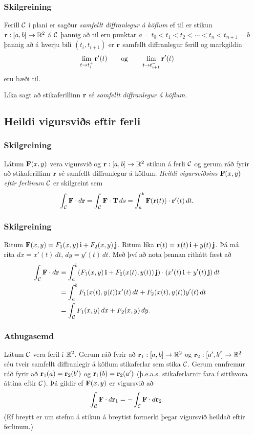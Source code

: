 \subsubsection{Skilgreining }
Ferill $\cal C$ í plani er sagður {\em samfellt diffranlegur á köflum} ef til er stikun $\mbox{${\bf r}$}:[a,b]\rightarrow {\mathbb R}^2$ á $\cal C$ þannig að  til eru punktar $a=t_0<t_1<t_2<\cdots<t_n<t_{n+1}=b$ þannig að á hverju bili $(t_i,t_{i+1})$ er $\mbox{${\bf r}$}$ samfellt diffranlegur ferill og markgildin
$$\lim_{t\rightarrow t_i^+}\mbox{${\bf r}$}'(t)\qquad\mbox{og}\qquad 
\lim_{t\rightarrow t_{i+1}^-}\mbox{${\bf r}$}'(t)$$
eru bæði til.  

Líka sagt að stikaferillinn $\mbox{${\bf r}$}$ sé {\em samfellt diffranlegur á köflum.}



\subsection{Heildi vigursviðs eftir ferli} 

\subsubsection{Skilgreining }
Látum $\mbox{${\bf F}$}(x,y)$ vera vigursvið og $\mbox{${\bf r}$}:[a,b]\rightarrow {\mathbb R}^2$ stikun á ferli $\cal C$ og gerum ráð fyrir að stikaferillinn $\mbox{${\bf r}$}$ sé samfellt diffranlegur á köflum.  {\em Heildi vigursviðsins} $\mbox{${\bf F}$}(x,y)$ {\em eftir ferlinum} $\cal C$ er skilgreint sem 
$$\int_{\cal C} \mbox{${\bf F}$}\cdot d\mbox{${\bf r}$}= \int_{\cal C} \mbox{${\bf F}$}\cdot \mbox{${\bf T}$}\,ds
=\int_a^b \mbox{${\bf F}$}(\mbox{${\bf r}$}(t))\cdot \mbox{${\bf r}$}'(t)\,dt.$$



\subsubsection{Skilgreining }
Ritum $\mbox{${\bf F}$}(x,y)=F_1(x,y)\,\mbox{${\bf i}$}+F_2(x,y)\,\mbox{${\bf j}$}$.  Ritum líka $\mbox{${\bf r}$}(t)=x(t)\,\mbox{${\bf i}$}+y(t)\,\mbox{${\bf j}$}$.  Þá má rita
$dx=x'(t)\,dt,\, dy=y'(t)\,dt$.  Með því að nota þennan rithátt fæst að 
\begin{align*}
\int_{\cal C}\mbox{${\bf F}$}\cdot d\mbox{${\bf r}$}&=\int_a^b
(F_1(x,y)\,\mbox{${\bf i}$}+F_2(x(t),y(t))\,\mbox{${\bf j}$})\cdot(x'(t)\,\mbox{${\bf i}$}+y'(t)\,\mbox{${\bf j}$})\,dt\\
&=\int_a^b F_1(x(t),y(t))x'(t)\,dt+F_2(x(t),y(t))y'(t)\,dt\\
&=\int_{\cal C} F_1(x,y)\,dx+F_2(x,y)\,dy.
\end{align*}




\subsubsection{Athugasemd }
Látum $\cal C$ vera feril í ${\mathbb R}^2$. Gerum ráð fyrir að $\mbox{${\bf r}$}_1:[a,b]\rightarrow {\mathbb R}^2$ og  $\mbox{${\bf r}$}_2:[a',b']\rightarrow {\mathbb R}^2$ séu tveir samfellt diffranlegir á köflum stikaferlar sem stika $\cal C$.  Gerum ennfremur ráð fyrir að $\mbox{${\bf r}$}_1(a)=\mbox{${\bf r}$}_2(b')$ og $\mbox{${\bf r}$}_1(b)=\mbox{${\bf r}$}_2(a')$ (þ.e.a.s. stikaferlarnir fara í sitthvora áttina eftir $\cal C$).  Þá gildir ef $\mbox{${\bf F}$}(x,y)$ er vigursvið að 
$$\int_{\cal C} \mbox{${\bf F}$}\cdot d\mbox{${\bf r}$}_1=-\int_{\cal C} \mbox{${\bf F}$}\cdot d\mbox{${\bf r}$}_2.$$
(Ef breytt er um stefnu á stikun á breytist formerki þegar vigursvið heildað eftir ferlinum.)





